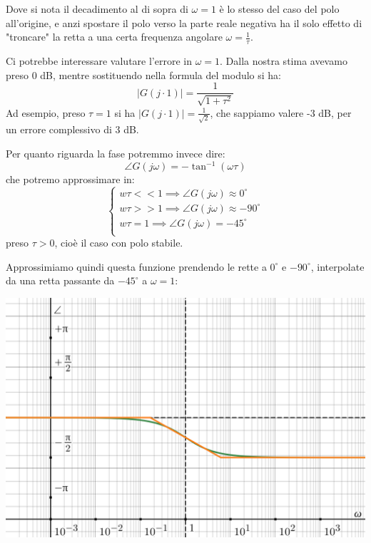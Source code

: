 \documentclass[a4paper,11pt]{article}
\begin{document}
\par\medskip

Dove si nota il decadimento al di sopra di $\omega = 1$ è lo stesso del caso del polo all'origine, e anzi spostare il polo verso la parte reale negativa ha il solo effetto di "troncare" la retta a una certa frequenza angolare $\omega= \frac{1}{\tau}$.

\par\smallskip

Ci potrebbe interessare valutare l'errore in $\omega = 1$.
Dalla nostra stima avevamo preso 0 dB, mentre sostituendo nella formula del modulo si ha:
$$
|G(j \cdot 1)| = \frac{1}{\sqrt{1 + \tau^2}}
$$
Ad esempio, preso $\tau = 1$ si ha $|G(j \cdot 1)| = \frac{1}{\sqrt{2}}$, che sappiamo valere -3 dB, per un errore complessivo di 3 dB.

\par\smallskip

Per quanto riguarda la fase potremmo invece dire:
$$
\angle G(j \omega) = - \tan^{-1} \left( \omega \tau \right)
$$
che potremo approssimare in:
\[
	\begin{cases}
		w \tau << 1 \implies \angle G(j\omega) \approx 0^\circ \\ 	
		w \tau >> 1 \implies \angle G(j\omega) \approx -90^\circ \\ 	
		w \tau = 1 \implies \angle G(j\omega) = -45^\circ \\ 	
	\end{cases}
\]
preso $\tau > 0$, cioè il caso con polo stabile.

\par\medskip

\noindent
\begin{minipage}{\textwidth}
Approssimiamo quindi questa funzione prendendo le rette a $0^\circ$ e $-90^\circ$, interpolate da una retta passante da $-45^\circ$ a $\omega = 1$:
\begin{center}
	\includegraphics[scale=0.3]{../figures/lowpass_bode/phase.png}
\end{center}
\end{minipage}
\end{document}
